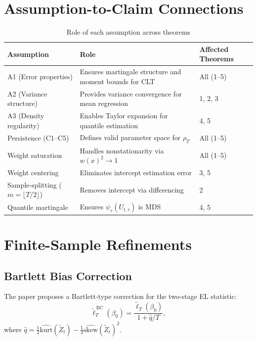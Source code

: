 \documentclass[11pt,a4paper]{article}
\theoremstyle{definition}
\theoremstyle{remark}
\begin{document}
\section{Assumption-to-Claim Connections}

\begin{table}[H]
\centering
\caption{Role of each assumption across theorems}
\label{tab:assumptions}
\begin{tabular}{p{3cm}p{6cm}p{5cm}}
\toprule
\textbf{Assumption} & \textbf{Role} & \textbf{Affected Theorems} \\
\midrule
A1 (Error properties) & Ensures martingale structure and moment bounds for CLT & All (1--5) \\
A2 (Variance structure) & Provides variance convergence for mean regression & 1, 2, 3 \\
A3 (Density regularity) & Enables Taylor expansion for quantile estimation & 4, 5 \\
Persistence (C1--C5) & Defines valid parameter space for $\rho_T$ & All (1--5) \\
Weight saturation & Handles nonstationarity via $w(x)^2 \to 1$ & All (1--5) \\
Weight centering & Eliminates intercept estimation error & 3, 5 \\
Sample-splitting ($m = \lfloor T/2 \rfloor$) & Removes intercept via differencing & 2 \\
Quantile martingale & Ensures $\psi_\tau(U_{t,\tau})$ is MDS & 4, 5 \\
\bottomrule
\end{tabular}
\end{table}

\section{Finite-Sample Refinements}

\subsection{Bartlett Bias Correction}

The paper proposes a Bartlett-type correction for the two-stage EL statistic:
\begin{equation}
    \widetilde{\ell}_T^{\,\text{BC}}(\beta_0) = \frac{\widetilde{\ell}_T(\beta_0)}{1 + \widehat{q}/T},
\end{equation}
where $\widehat{q} = \frac{1}{2}\widehat{\text{kurt}}(\widetilde{Z}_t) - \frac{1}{3}\widehat{\text{skew}}(\widetilde{Z}_t)^2$.
\end{document}
